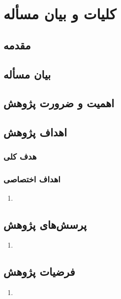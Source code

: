 \ChapterStart
\chapter{کلیات و بیان مسأله}
\section{مقدمه}

\section{بیان مسأله}

\section{اهمیت و ضرورت پژوهش}

\section{اهداف پژوهش}

\subsection{هدف کلی}

\subsection{اهداف اختصاصی}
\begin{enumerate}
  \item 
\end{enumerate}

\section{پرسش‌های پژوهش}
\begin{enumerate}
  \item
\end{enumerate}

\section{فرضیات پژوهش}
\label{sec:hypotheses}
\begin{enumerate}
  \item 
\end{enumerate}

